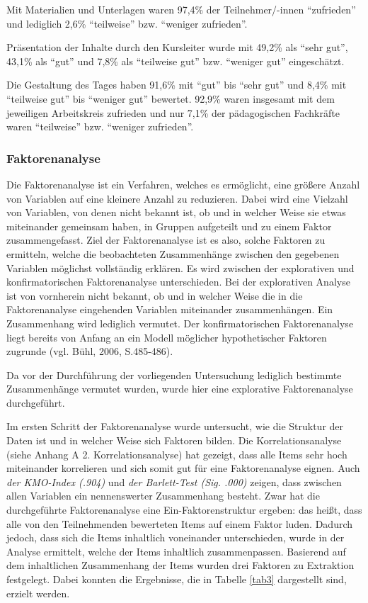 \documentclass[12pt,a4paper]{article}
\begin{document}
Mit Materialien und Unterlagen waren 97,4\% der Teilnehmer/-innen "`zufrieden"' und lediglich 2,6\% "`teilweise"' bzw. "`weniger zufrieden"'. 

Präsentation der Inhalte durch den Kursleiter wurde mit 49,2\% als "`sehr gut"', 43,1\% als "`gut"' und 7,8\% als "`teilweise gut"' bzw. "`weniger gut"' eingeschätzt. 

Die Gestaltung des Tages haben 91,6\% mit "`gut"' bis "`sehr gut"' und 8,4\% mit "`teilweise gut"' bis "`weniger gut"' bewertet. 92,9\% waren insgesamt mit dem jeweiligen Arbeitskreis zufrieden und nur 7,1\% der pädagogischen Fachkräfte waren "`teilweise"' bzw. "`weniger zufrieden"'.

\subsubsection{Faktorenanalyse}

Die Faktorenanalyse ist ein Verfahren, welches es ermöglicht, eine größere Anzahl von Variablen auf eine kleinere Anzahl zu reduzieren. Dabei wird eine Vielzahl von Variablen, von denen nicht bekannt ist, ob und in welcher Weise sie etwas miteinander gemeinsam haben, in Gruppen aufgeteilt und zu einem Faktor zusammengefasst. Ziel der Faktorenanalyse ist es also, solche Faktoren zu ermitteln, welche die beobachteten Zusammenhänge zwischen den gegebenen Variablen möglichst vollständig erklären. Es wird zwischen der explorativen und konfirmatorischen Faktorenanalyse unterschieden. Bei der explorativen Analyse ist von vornherein nicht bekannt, ob und in welcher Weise die in die Faktorenanalyse eingehenden Variablen miteinander zusammenhängen. Ein Zusammenhang wird lediglich vermutet. Der konfirmatorischen Faktorenanalyse liegt bereits von Anfang an ein Modell möglicher hypothetischer Faktoren zugrunde (vgl. Bühl, 2006, S.485-486). 

Da vor der Durchführung der  vorliegenden Untersuchung lediglich bestimmte Zusammenhänge vermutet wurden, wurde hier eine explorative Faktorenanalyse durchgeführt. 

Im ersten Schritt der Faktorenanalyse wurde untersucht, wie die Struktur der Daten ist und in welcher Weise sich Faktoren bilden. Die Korrelationsanalyse (siehe Anhang A 2. Korrelationsanalyse)
hat gezeigt, dass alle Items sehr hoch miteinander korrelieren und sich somit gut für eine Faktorenanalyse eignen. Auch \textit{der KMO-Index (.904)} und \textit{der Barlett-Test (Sig. .000)} zeigen, dass zwischen allen Variablen ein nennenswerter Zusammenhang besteht. Zwar hat die durchgeführte Faktorenanalyse eine Ein-Faktorenstruktur ergeben: das heißt, dass alle von den Teilnehmenden bewerteten Items auf einem Faktor luden. Dadurch jedoch, dass sich die Items inhaltlich voneinander unterschieden, wurde in der Analyse ermittelt, welche der Items inhaltlich zusammenpassen. Basierend auf dem inhaltlichen Zusammenhang der Items wurden drei Faktoren zu Extraktion festgelegt. Dabei konnten die Ergebnisse, die in Tabelle \ref{tab3} dargestellt sind, erzielt werden.
\end{document}
